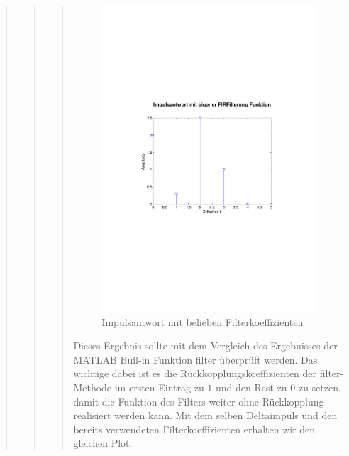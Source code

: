 \begin{quote}
\begin{quote}
\begin{quote}
			\begin{figure}[H]
		            \centering
		                \includegraphics[scale=0.5, trim = 1cm 6cm 1.5cm 8cm,
		                clip]{./Bilder/Impulsantwort_aufgabe1}
		                    \caption{Impulsantwort mit belieben Filterkoeffizienten}
		                    \label{fig:./Bilder/Impulsantwort_aufgabe1}
		            \end{figure}
		            
			Dieses Ergebnis sollte mit dem Vergleich des Ergebnisses der MATLAB
			Buil-in Funktion filter überprüft werden. Das wichtige dabei ist es die
			Rückkopplungskoeffizienten der filter-Methode im ersten Eintrag zu $1$ und den
			Rest zu $0$ zu setzen, damit die Funktion des Filters weiter ohne Rückkopplung
			realisiert werden kann. Mit dem selben Deltaimpuls und den
			bereits verwendeten Filterkoeffizienten erhalten wir den gleichen Plot:
			

\end{quote}
\end{quote}
\end{quote}

